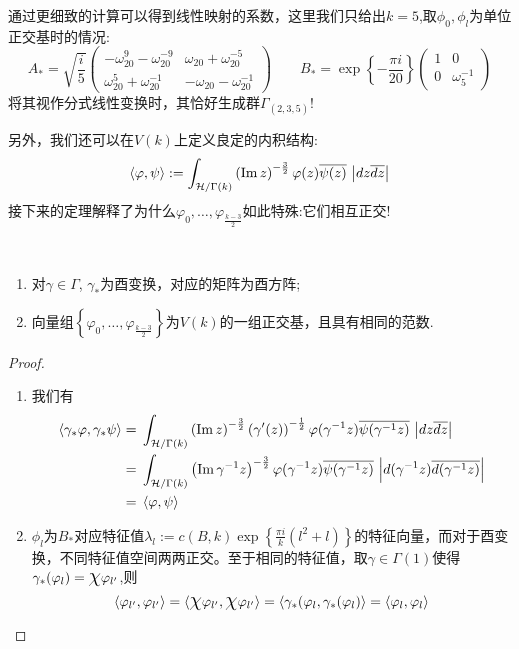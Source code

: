 \begin{remark}
	通过更细致的计算可以得到线性映射的系数，这里我们只给出$k=5$,取$\phi_0,\phi_l$为单位正交基时的情况:
	$$A_*=\sqrt{\frac{i}{5}} \begin{pmatrix}
	-\omega_{20}^9-\omega_{20}^{-9} & \omega_{20}+\omega_{20}^{-5} \\ \omega_{20}^5+\omega_{20}^{-1} & -\omega_{20}-\omega_{20}^{-1}
	\end{pmatrix} \qquad B_*= \exp \left\{-\frac{\pi i}{20} \right\}\begin{pmatrix}
	1 & 0\\ 0 & \omega_5^{-1}
	\end{pmatrix}$$
	将其视作分式线性变换时，其恰好生成群$\Gamma_{(2,3,5)}$!
\end{remark}
另外，我们还可以在$V(k)$上定义良定的内积结构:
$$\left< \varphi, \psi \right> := \int_{\mathcal{H}/\Gamma(k) } \left( \operatorname{\operatorname{Im}} z \right)^{-\frac{3}{2}} \varphi(z) \overline{\psi(z)} \,\left|dz\overline{dz}\right|$$
接下来的定理解释了为什么$\varphi_0,\ldots,\varphi_{\frac{k-3}{2}}$如此特殊:它们相互正交!
\begin{theorem}\
	\begin{enumerate}[(1)]
		\item 对$\gamma \in \Gamma$, $\gamma_*$为酉变换，对应的矩阵为酉方阵;
		\item 向量组$\left\{ \varphi_0,\ldots,\varphi_{\frac{k-3}{2}}  \right\}$为$V(k)$的一组正交基，且具有相同的范数.
	\end{enumerate}
	
\end{theorem}
\begin{proof}\
	\begin{enumerate}[(1)]
		\item 我们有
		\begin{equation*}
		\begin{aligned}
		\left< \gamma_*\varphi, \gamma_*\psi \right>=\;&\int_{\mathcal{H}/\Gamma(k) } \left( \operatorname{\operatorname{Im}} z \right)^{-\frac{3}{2}} \left(\gamma'(z)\right)^{-\frac{1}{2}}\varphi(\gamma^{-1}z) \overline{\psi(\gamma^{-1}z)} \,\left|dz\overline{dz}\right|\\
		=\;&\int_{\mathcal{H}/\Gamma(k) } \left( \operatorname{\operatorname{Im}} \gamma^{-1}z \right)^{-\frac{3}{2}} \varphi(\gamma^{-1}z) \overline{\psi(\gamma^{-1}z)} \,\left|d(\gamma^{-1}z)\overline{d(\gamma^{-1}z)}\right|\\
		=\;& \left< \varphi, \psi \right>
		\end{aligned}
		\end{equation*}
		\item $\phi_l$为$B_*$对应特征值$\lambda_l:=c(B,k)\exp \left\{ \frac{\pi i}{k}(l^2+l) \right\}$的特征向量，而对于酉变换，不同特征值空间两两正交。至于相同的特征值，取$\gamma \in \Gamma(1)$使得$\gamma_*(\varphi_l)=\mbox{\Large$\chi$}\varphi_{l'}$,则
		$$\left< \varphi_{l'}, \varphi_{l'} \right>=\left< \mbox{\Large$\chi$}\varphi_{l'}, \mbox{\Large$\chi$}\varphi_{l'} \right>=\left< \gamma_*(\varphi_{l}, \gamma_*(\varphi_{l}) \right>=\left< \varphi_{l}, \varphi_{l} \right>$$
	\end{enumerate}
\end{proof}

